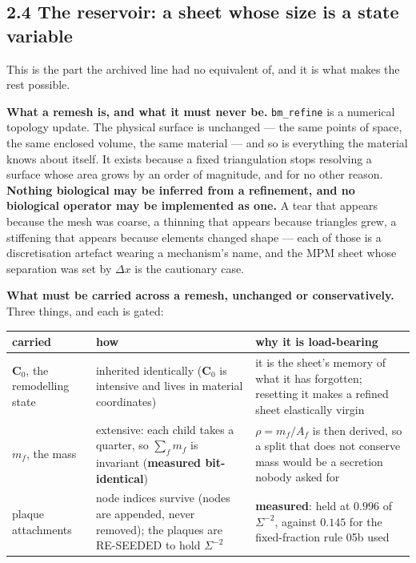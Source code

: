 \documentclass[10pt,a4paper]{article}
\newcommand{\op}[1]{\texttt{#1}}
\begin{document}
\subsection*{2.4\; The reservoir: a sheet whose size is a state variable}


This is the part the archived line had no equivalent of, and it is what makes the rest possible.

\textbf{What a remesh is, and what it must never be.} \op{bm\_refine} is a numerical topology update.
The physical surface is unchanged --- the same points of space, the same enclosed volume, the same
material --- and so is everything the material knows about itself. It exists because a fixed
triangulation stops resolving a surface whose area grows by an order of magnitude, and for no other
reason. \textbf{Nothing biological may be inferred from a refinement, and no biological operator may be
implemented as one.} A tear that appears because the mesh was coarse, a thinning that appears because
triangles grew, a stiffening that appears because elements changed shape --- each of those is a
discretisation artefact wearing a mechanism's name, and the MPM sheet whose separation was set by
$\Delta x$ is the cautionary case.

\textbf{What must be carried across a remesh, unchanged or conservatively.} Three things, and each is
gated:

\smallskip
{\footnotesize
\begin{tabular}{@{}p{3.0cm}p{5.9cm}p{7.3cm}@{}}\toprule
carried & how & why it is load-bearing\\\midrule
$\mathbf C_0$, the remodelling state & inherited identically ($\mathbf C_0$ is intensive and lives in
  material coordinates) & it is the sheet's memory of what it has forgotten; resetting it makes a
  refined sheet elastically virgin\\
$m_f$, the mass & extensive: each child takes a quarter, so $\sum_f m_f$ is invariant
  (\textbf{measured bit-identical}) & $\rho=m_f/A_f$ is then derived, so a split that does not conserve
  mass would be a secretion nobody asked for\\
plaque attachments & node indices survive (nodes are appended, never removed); the plaques are
  RE-SEEDED to hold $\Sigma^{-2}$ & \textbf{measured}: held at $0.996$ of $\Sigma^{-2}$, against
  $0.145$ for the fixed-fraction rule 05b used\\
\bottomrule
\end{tabular}}
\smallskip
\end{document}
